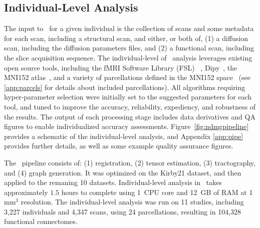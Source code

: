 \documentclass[11pt]{article}
\begin{document}
%

\subsection{Individual-Level Analysis}

The input to \ndmg~for a given individual is  the collection of scans and some metadata for each scan, including a structural scan, %
and either, or both of, (1) a diffusion scan, including the diffusion parameters files,  and (2) a functional scan, including the slice acquisition sequence.
The individual-level of \ndmg~analysis leverages existing open source tools, including
the fMRI Software Library (FSL) ~\cite{fsl1, fsl2, fsl3}, Dipy~\cite{dipy}, the MNI152 atlas~\cite{mni152}, and a variety of parcellations defined in the MNI152 space~\cite{desikan, aal, jhu, harvardoxford, talairach, slab907, slab1068, pvt, glasser} (see \ref{app:parcels} for details about included parcellations). 
All algorithms requiring hyper-parameter selection were initially set to the suggested parameters for each tool, and tuned to improve the accuracy, reliability, expediency, and robustness of the results.
The output of each processing stage includes data derivatives and QA figures to enable individualized accuracy assessments.
Figure~\ref{fig:ndmgpipeline} provides a schematic of the individual-level analysis, and Appendix  
\ref{app:pipe} provides further details, as well as some example quality assurance figures.

The \ndmgd~pipeline consists of: (1) registration, (2) tensor estimation, (3) tractography, and (4) graph generation. It was optimized on the Kirby21 dataset, and then applied to the remaning 10 datasets.
Individual-level analysis in \ndmgd~takes approximately $1.5$ hours to complete using 1~CPU core and 12~GB of RAM at 1 mm$^3$ resolution.
The individual-level analysis was run on 11 studies, including 3,227 individuals and 4,347 scans, using 24 parcellations,  resulting in 104,328 functional connectomes.
\end{document}
